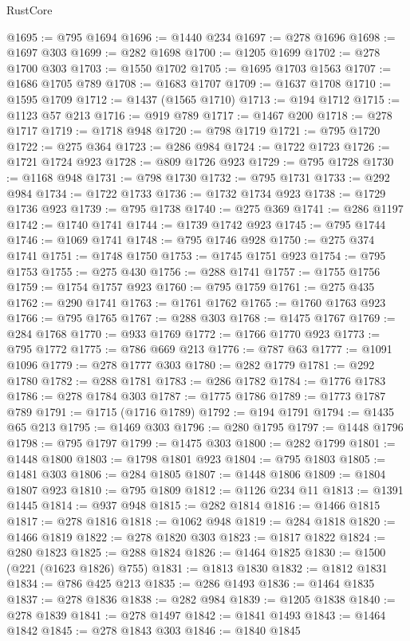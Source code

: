 \begin{lexlean}{RustCore}
\begin{coremodule}
@1695 := @795 @1694
@1696 := @1440 @234
@1697 := @278 @1696
@1698 := @1697 @303
@1699 := @282 @1698
@1700 := @1205 @1699
@1702 := @278 @1700 @303
@1703 := @1550 @1702
@1705 := @1695 @1703 @1563
@1707 := @1686 @1705 @789
@1708 := @1683 @1707
@1709 := @1637 @1708
@1710 := @1595 @1709
@1712 := @1437 (@1565 @1710)
@1713 := @194 @1712
@1715 := @1123 @57 @213
@1716 := @919 @789
@1717 := @1467 @200
@1718 := @278 @1717
@1719 := @1718 @948
@1720 := @798 @1719
@1721 := @795 @1720
@1722 := @275 @364
@1723 := @286 @984
@1724 := @1722 @1723
@1726 := @1721 @1724 @923
@1728 := @809 @1726 @923
@1729 := @795 @1728
@1730 := @1168 @948
@1731 := @798 @1730
@1732 := @795 @1731
@1733 := @292 @984
@1734 := @1722 @1733
@1736 := @1732 @1734 @923
@1738 := @1729 @1736 @923
@1739 := @795 @1738
@1740 := @275 @369
@1741 := @286 @1197
@1742 := @1740 @1741
@1744 := @1739 @1742 @923
@1745 := @795 @1744
@1746 := @1069 @1741
@1748 := @795 @1746 @928
@1750 := @275 @374 @1741
@1751 := @1748 @1750
@1753 := @1745 @1751 @923
@1754 := @795 @1753
@1755 := @275 @430
@1756 := @288 @1741
@1757 := @1755 @1756
@1759 := @1754 @1757 @923
@1760 := @795 @1759
@1761 := @275 @435
@1762 := @290 @1741
@1763 := @1761 @1762
@1765 := @1760 @1763 @923
@1766 := @795 @1765
@1767 := @288 @303
@1768 := @1475 @1767
@1769 := @284 @1768
@1770 := @933 @1769
@1772 := @1766 @1770 @923
@1773 := @795 @1772
@1775 := @786 @669 @213
@1776 := @787 @63
@1777 := @1091 @1096
@1779 := @278 @1777 @303
@1780 := @282 @1779
@1781 := @292 @1780
@1782 := @288 @1781
@1783 := @286 @1782
@1784 := @1776 @1783
@1786 := @278 @1784 @303
@1787 := @1775 @1786
@1789 := @1773 @1787 @789
@1791 := @1715 (@1716 @1789)
@1792 := @194 @1791
@1794 := @1435 @65 @213
@1795 := @1469 @303
@1796 := @280 @1795
@1797 := @1448 @1796
@1798 := @795 @1797
@1799 := @1475 @303
@1800 := @282 @1799
@1801 := @1448 @1800
@1803 := @1798 @1801 @923
@1804 := @795 @1803
@1805 := @1481 @303
@1806 := @284 @1805
@1807 := @1448 @1806
@1809 := @1804 @1807 @923
@1810 := @795 @1809
@1812 := @1126 @234 @11
@1813 := @1391 @1445
@1814 := @937 @948
@1815 := @282 @1814
@1816 := @1466 @1815
@1817 := @278 @1816
@1818 := @1062 @948
@1819 := @284 @1818
@1820 := @1466 @1819
@1822 := @278 @1820 @303
@1823 := @1817 @1822
@1824 := @280 @1823
@1825 := @288 @1824
@1826 := @1464 @1825
@1830 := @1500 (@221 (@1623 @1826) @755)
@1831 := @1813 @1830
@1832 := @1812 @1831
@1834 := @786 @425 @213
@1835 := @286 @1493
@1836 := @1464 @1835
@1837 := @278 @1836
@1838 := @282 @984
@1839 := @1205 @1838
@1840 := @278 @1839
@1841 := @278 @1497
@1842 := @1841 @1493
@1843 := @1464 @1842
@1845 := @278 @1843 @303
@1846 := @1840 @1845

\end{coremodule}
\end{lexlean}
